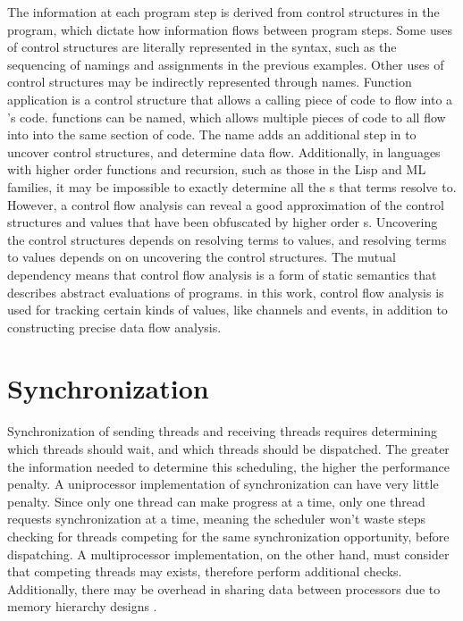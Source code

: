 \documentclass[letterpaper, 11pt]{extarticle}
\begin{document}
The information at each program step is derived from control structures in the program, which
dictate how information flows between program steps. Some uses of control structures are
literally represented in the syntax, such as the sequencing of namings and assignments in the
previous examples. Other uses of control structures may be indirectly represented through
names. Function application is a control structure that allows a calling piece of code to
flow into a 's code.  functions can be named, which allows
multiple pieces of code to all flow into into the same section of code. The name adds an
additional step in to uncover control structures, and determine data flow.
Additionally, in languages with higher order functions and recursion, such as those in the Lisp
and ML families, it may be impossible to exactly determine all the s that
terms resolve to. However, a control flow analysis can reveal a good
approximation of the control structures and values that have been obfuscated by higher order
s. Uncovering the control structures depends on resolving terms
to values, and resolving terms to values depends on on uncovering the control
structures. The mutual dependency means that control flow analysis is a form of
static semantics that describes abstract evaluations of programs. in this work, control flow
analysis is used for tracking certain kinds of values, like channels and events, in addition to
constructing precise data flow analysis. 


\section{Synchronization}
Synchronization of sending threads and receiving threads
requires determining which threads should wait, and which threads should be dispatched.
The greater the information needed
to determine this scheduling, the higher the performance penalty. A uniprocessor
implementation of synchronization can have very little penalty. Since only one thread can make
progress at a time, only one thread requests synchronization at a time, meaning the scheduler
won't waste steps checking for threads competing for the same synchronization opportunity,
before dispatching. A multiprocessor implementation, on the other hand, must consider that
competing threads may exists, therefore perform additional checks. Additionally, there may be 
overhead in sharing data between processors due to memory hierarchy designs \cite{hennessy2011computer}. 
\end{document}
